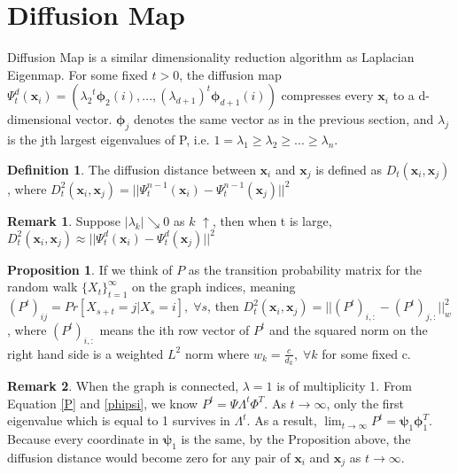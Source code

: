 \documentclass[11pt]{article}
\theoremstyle{definition}
\newtheorem{definition}{Definition}
\newtheorem{remark}{Remark}
\newtheorem{prop}[theorem]{Proposition}
\begin{document}
\section{Diffusion Map}
Diffusion Map is a similar dimensionality reduction algorithm as Laplacian Eigenmap. For some fixed $t>0$, the diffusion map $\Psi_t^d(\boldsymbol{x}_i) = ({\lambda_{2}}^t\boldsymbol{\phi}_2(i), ..., (\lambda_{d+1})^t\boldsymbol{\phi}_{d+1}(i))$ compresses every $\boldsymbol{x}_i$ to a d-dimensional vector. $\boldsymbol{\phi}_{j}$ denotes the same vector as in the previous section, and $\lambda_j$ is the jth largest eigenvalues of P, i.e. $1 = \lambda_1 \geq \lambda_2 \geq ... \geq \lambda_n$.
\begin{definition}
	The diffusion distance between $\boldsymbol{x}_i$ and $\boldsymbol{x}_j$ is defined as $D_t(\boldsymbol{x}_i, \boldsymbol{x}_j)$, where $D_t^2(\boldsymbol{x}_i, \boldsymbol{x}_j) = ||\Psi_t^{n-1}(\boldsymbol{x}_i) - \Psi_t^{n-1}(\boldsymbol{x}_j)||^2$
\end{definition}
\begin{remark}
	Suppose $|\lambda_k| \searrow 0$ as $k$ $\uparrow$, then when t is large, $D_t^2(\boldsymbol{x}_i, \boldsymbol{x}_j) \approx ||\Psi_t^{d}(\boldsymbol{x}_i) - \Psi_t^{d}(\boldsymbol{x}_j)||^2$
\end{remark}
\begin{prop}
\label{diffusion}
If we think of $P$ as the transition probability matrix for the random walk $\{X_t\}_{t=1}^\infty$ on the graph indices, meaning $(P^t)_{ij} = Pr[X_{s+t} = j | X_s = i],\; \forall s$, then $D_t^2(\boldsymbol{x}_i, \boldsymbol{x}_j) = ||(P^t)_{i,:} - (P^t)_{j,:}||_w^2$, where $(P^t)_{i,:}$ means the ith row vector of $P^t$ and the squared norm on the right hand side is a weighted $L^2$ norm where $w_k = \frac{c}{d_k}, \;\forall k$ for some fixed c.
\end{prop}
\begin{remark}
When the graph is connected, $\lambda = 1$ is of multiplicity 1. From Equation \ref{P} and \ref{phipsi}, we know $P^t = \Psi \Lambda^t \Phi^T$. As $t \rightarrow \infty$, only the first eigenvalue which is equal to 1 survives in $\Lambda^t$. As a result, $\lim_{t \rightarrow \infty} P^t = \boldsymbol{\psi}_1\boldsymbol{\phi}_1^T$. Because every coordinate in $\boldsymbol{\psi}_1$ is the same, by the Proposition above, the diffusion distance would become zero for any pair of $\boldsymbol{x}_i$ and $\boldsymbol{x}_j$ as $t \rightarrow \infty$.
\end{remark}
\end{document}
